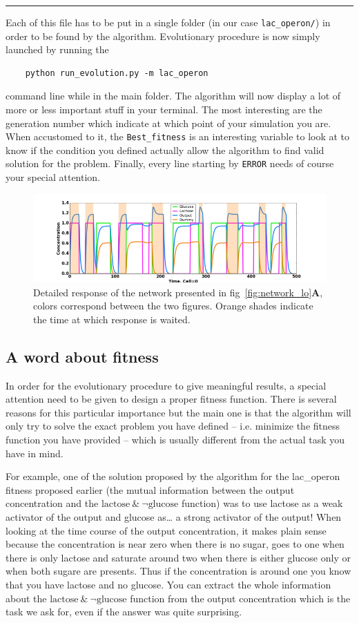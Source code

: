 \documentclass[]{article}
\newcommand{\sepline}{\begin{center}\rule{0.5\linewidth}{\linethickness}\end{center}}
\begin{document}
\sepline{}

Each of this file has to be put in a single folder (in our case
\verb#lac_operon/#) in order to be found by the algorithm. Evolutionary
procedure is now simply launched by running the
\begin{verbatim}
    python run_evolution.py -m lac_operon
\end{verbatim}
command line while in the main
folder. The algorithm will now display a lot of more or less important
stuff in your terminal. The most interesting are the generation number
which indicate at which point of your simulation you are. When
accustomed to it, the \verb#Best_fitness# is an interesting variable to look
at to know if the condition you defined actually allow the algorithm to
find valid solution for the problem. Finally, every line starting
by \verb#ERROR# needs of course your special attention.

\begin{figure}
\centering
\includegraphics[width=.8\textwidth]{p2_response}
\caption{Detailed response of the network presented in
fig~\ref{fig:network_lo}{\bf A}, colors correspond between the two figures.
Orange shades indicate the time at which response is waited.}
\label{fig:response_lo}
\end{figure}

\subsection*{A word about fitness}\label{a-word-about-fitness}

In order for the evolutionary procedure to give meaningful results, a
special attention need to be given to design a proper fitness function.
There is several reasons for this particular importance but the main one
is that the algorithm will only try to solve the exact problem you have
defined -- i.e. minimize the fitness function you have provided -- which
is usually different from the actual task you have in mind.

For example, one of the solution proposed by the algorithm for the
lac\_operon fitness proposed earlier (the mutual information between the
output concentration and the $\text{lactose}~\&~\neg \text{glucose}$ function) was to use
lactose as a weak activator of the output and glucose as\ldots{} a
strong activator of the output! When looking at the time
course of the output concentration, it makes plain sense because the
concentration is near zero when there is no sugar, goes to one when
there is only lactose and saturate around two when there is either
glucose only or when both sugare are presents. Thus if the concentration
is around one you know that you have lactose and no glucose. You can
extract the whole information about the $\text{lactose}~\&~\neg \text{glucose}$
function from the output concentration which is the
task we ask for, even if the answer was quite surprising.
\end{document}
